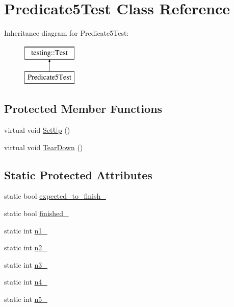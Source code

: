 \hypertarget{class_predicate5_test}{\section{Predicate5\-Test Class Reference}
\label{class_predicate5_test}
}
Inheritance diagram for Predicate5\-Test\-:\begin{figure}[H]
\begin{center}
\leavevmode
\includegraphics[height=2.000000cm]{class_predicate5_test}
\end{center}
\end{figure}
\subsection*{Protected Member Functions}
\begin{DoxyCompactItemize}
\item 
virtual void \hyperlink{class_predicate5_test_a42bf622b4f2134d0497cd42fd2e3e1df}{Set\-Up} ()
\item 
virtual void \hyperlink{class_predicate5_test_ab7bc4521d96174d5ef96156edc15444d}{Tear\-Down} ()
\end{DoxyCompactItemize}
\subsection*{Static Protected Attributes}
\begin{DoxyCompactItemize}
\item 
static bool \hyperlink{class_predicate5_test_aa502b7a330cc5c64785ff59aad3ef180}{expected\-\_\-to\-\_\-finish\-\_\-}
\item 
static bool \hyperlink{class_predicate5_test_a5003aada64accf06cdb28b1ff1797353}{finished\-\_\-}
\item 
static int \hyperlink{class_predicate5_test_a356c8e361185b234a417ed895eb14e38}{n1\-\_\-}
\item 
static int \hyperlink{class_predicate5_test_a5bf48ba65b7baf20abe1d2af90779ce0}{n2\-\_\-}
\item 
static int \hyperlink{class_predicate5_test_a63723efb915dbf418c31b97b64dabc0e}{n3\-\_\-}
\item 
static int \hyperlink{class_predicate5_test_a5d66aa58badddc8d3d8070a93c0558d6}{n4\-\_\-}
\item 
static int \hyperlink{class_predicate5_test_a96badba6366235a2771b27ea014bd9ce}{n5\-\_\-}
\end{DoxyCompactItemize}
